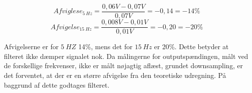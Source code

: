 \begin{equation} \label{equ:afvigelse1}
Afviglese_{5~Hz} = \frac{0,06V-0,07V}{0,07V} = -0,14  = - 14 \%
\end{equation}
\begin{equation} \label{equ:afvigelse2}
Afvigelse_{15~Hz} = \frac{0,008V-0,01V}{0,01V} = -0,20  = -20 \%
\end{equation}

\noindent 
Afvigelserne er for $5~HZ$ 14\%, mens det for $15~Hz$ er 20\%. Dette betyder at filteret ikke dæmper signalet nok. Da målingerne for outputspændingen, målt ved de forskellige frekvenser, ikke er målt nøjagtig aflæst, grundet downsampling, er det forventet, at der er en større afvigelse fra den teoretiske udregning. På baggrund af dette godtages filteret. 
